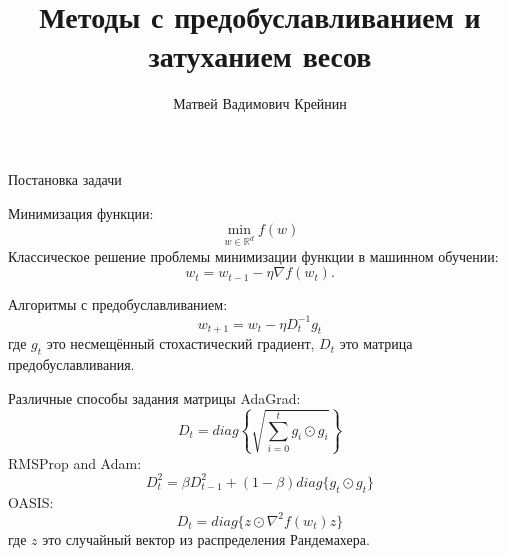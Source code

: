 \documentclass[aspectratio=169, 12pt]{beamer}
\title[\hbox to 56mm{Feature}]{Методы с предобуславливанием и затуханием весов}
\author[М.\,В.~Крейнин]{Матвей Вадимович Крейнин}
\institute{Московский Физико-Технический Институт}
\date{
\footnotesize
\par\smallskip\emph{Кафедра:} Интеллектуальный анализ данных
\par\smallskip\emph{Научный руководитель:} кандидат ф.-м. наук А.\,Н.~Безносиков
\par\bigskip\small 2024}
\begin{document}
\maketitle

\begin{frame}{Постановка задачи}

    Минимизация функции:
    \begin{equation}
    \label{eq:general}
        \min_{w \in \mathbb{R}^d} f(w)
    \end{equation} 
    Классическое решение проблемы минимизации функции в машинном обучении:
    \begin{equation*}
        w_t = w_{t-1} - \eta \nabla f(w_t).
    \end{equation*}

    Алгоритмы с предобуславливанием:
    \begin{equation*}
        w_{t+1} = w_t - \eta D_t^{-1}g_t
    \end{equation*}
    где $g_t$ это несмещённый стохастический градиент, $D_t$ это матрица предобуславливания.
\end{frame}

\begin{frame}{Различные способы задания матрицы }
    AdaGrad:
    \begin{equation*}
        D_t = diag \left\{\sqrt{\sum\limits_{i=0}^t g_i \odot g_i} \right\}
    \end{equation*}
    RMSProp and Adam:
    \begin{equation*}
        D_t^2 = \beta D_{t-1}^2 + (1-\beta) diag \{g_t \odot g_t \}
    \end{equation*}
    OASIS:
    \begin{equation*}
        D_t = diag \{z \odot \nabla^2 f(w_t) z\}
    \end{equation*}
    где $z$ это случайный вектор из распределения Рандемахера.
\end{frame}
\end{document}
